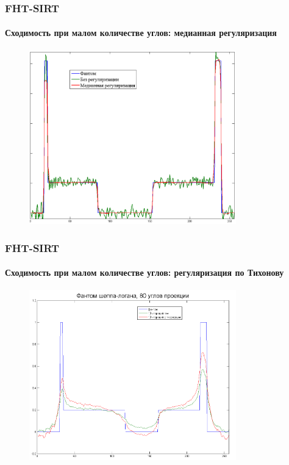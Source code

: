 \documentclass[12pt]{beamer}
\begin{document}
\begin{frame}
\frametitle{FHT-SIRT}
\framesubtitle{Сходимость при малом количестве углов: медианная регуляризация}

\begin{figure}
\includegraphics[width=0.8\textwidth]{slice_11}
\end{figure}

\end{frame}

\begin{frame}
\frametitle{FHT-SIRT}
\framesubtitle{Сходимость при малом количестве углов: регуляризация по Тихонову}

    \begin{figure}
    \includegraphics[width=0.8\textwidth]{tikhonov}
    \end{figure}

\end{frame}
\end{document}
